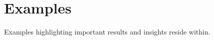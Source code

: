 \section{Examples}
\label{examples}

Examples highlighting important results and insights reside within.


